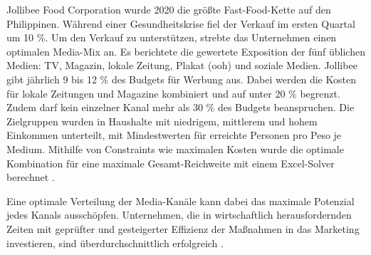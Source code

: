 \par
Jollibee Food Corporation wurde 2020 die größte Fast-Food-Kette auf den Philippinen. Während einer Gesundheitskrise fiel der Verkauf im ersten Quartal um 10 \%. Um den Verkauf zu unterstützen, strebte das Unternehmen einen optimalen Media-Mix an. Es berichtete die gewertete Exposition der fünf üblichen Medien: TV, Magazin, lokale Zeitung, Plakat (\ac{ooh}) und soziale Medien. Jollibee gibt jährlich 9 bis 12 \% des Budgets für Werbung aus. Dabei werden die Kosten für lokale Zeitungen und Magazine kombiniert und auf unter 20 \% begrenzt. Zudem darf kein einzelner Kanal mehr als 30 \% des Budgets beanspruchen. Die Zielgruppen wurden in Haushalte mit niedrigem, mittlerem und hohem Einkommen unterteilt, mit Mindestwerten für erreichte Personen pro Peso je Medium. Mithilfe von Constraints wie maximalen Kosten wurde die optimale Kombination für eine maximale Gesamt-Reichweite mit einem Excel-Solver berechnet \cite{Tapiceria2020}. \par
Eine optimale Verteilung der Media-Kanäle kann dabei das maximale Potenzial jedes Kanals ausschöpfen. Unternehmen, die in wirtschaftlich herausfordernden Zeiten mit geprüfter und gesteigerter Effizienz der Maßnahmen in das Marketing investieren, sind überdurchschnittlich erfolgreich \cite{237097}. \par 
